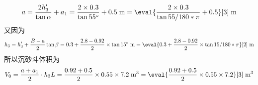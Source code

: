 \begin{enumerate}
	\begin{align}
		a=\dfrac{2h_3'}{\tan{\alpha}}+a_1 = \dfrac{2\times 0.3}{\tan{55^{\circ}}}+0.5 \;\text{m} = \eval{\dfrac{2\times 0.3}{\tan{55/180*\pi}}+0.5}[3] \;\text{m}
	\end{align}
	又因为
	\begin{align}
		h_3=h_3'+\dfrac{B-a}{2}\tan{\beta} = 0.3+\dfrac{2.8-0.92}{2}\times \tan{15^{\circ}} \;\text{m} = \eval{0.3+\dfrac{2.8-0.92}{2}\times \tan{15/180*\pi}}[2] \;\text{m}
	\end{align}
	所以沉砂斗体积为
	\begin{align}
		V_0=\dfrac{a+a_1}{2}\cdot h_3 L = \dfrac{0.92+0.5}{2}\times 0.55 \times 7.2 \;\text{m$^3$} = \eval{\dfrac{0.92+0.5}{2}\times 0.55 \times 7.2}[3] \;\text{m$^3$}
	\end{align}
\end{enumerate}



